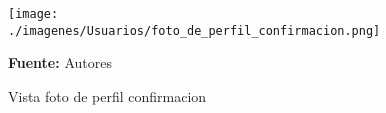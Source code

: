 \begin{figure}[!htb]
  \begin{center}
\texttt{[image: ./imagenes/Usuarios/foto\_de\_perfil\_confirmacion.png]}
    \caption{Vista foto de perfil confirmacion}
    \label{fig:Vista_foto_de_perfil_confirmacion}
    \textbf{Fuente:}  Autores
  \end{center}
\end{figure}
